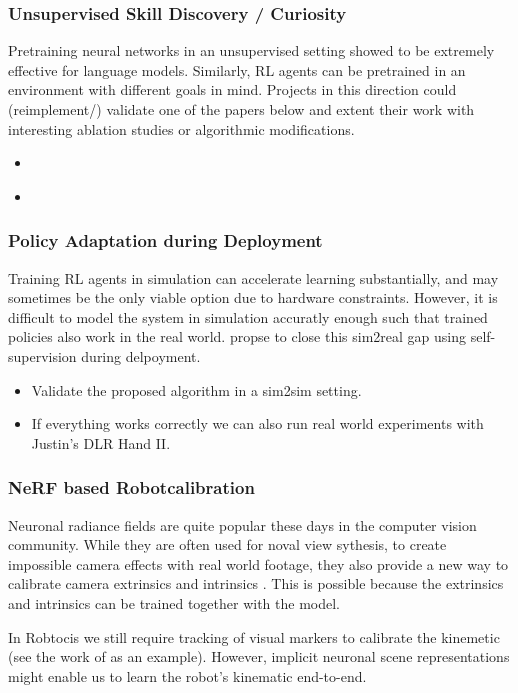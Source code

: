 \documentclass[a4paper]{article}
\begin{document}
\subsubsection{Unsupervised Skill Discovery / Curiosity}
Pretraining neural networks in an unsupervised setting showed to be extremely effective for language models. Similarly, RL agents can be pretrained in an environment with different goals in mind. Projects in this direction could (reimplement/) validate one of the papers below and extent their work with interesting ablation studies or algorithmic modifications.
\begin{itemize}
  \item \cite{Plan2Explore2020}
  \item \cite{DADS2020}
\end{itemize}

\subsubsection{Policy Adaptation during Deployment}
Training RL agents in simulation can accelerate learning substantially, and may sometimes be the only viable option due to hardware constraints. However, it is difficult to model the system in simulation accuratly enough such that trained policies also work in the real world. \cite{Hansen2021} propse to close this sim2real gap using self-supervision during delpoyment.
\begin{itemize}
  \item Validate the proposed algorithm in a sim2sim setting.
  \item If everything works correctly we can also run real world experiments with Justin's DLR Hand II.
\end{itemize}

\subsubsection{NeRF based Robotcalibration}
  Neuronal radiance fields are quite popular these days in the computer vision community. While they are often used for noval view sythesis, to create impossible camera effects with real world footage, they also provide a new way to calibrate camera extrinsics and intrinsics \citep{lin2021barf, Sucar:etal:ICCV2021, wang2021nerfmm, SCNeRF2021}.
  This is possible because the extrinsics and intrinsics can be trained together with the model.

  In Robtocis we still require tracking of visual markers to calibrate the kinemetic (see the work of \cite{Birbach2014} as an example). However, implicit neuronal scene representations might enable us to learn the robot's kinematic end-to-end.
\end{document}
